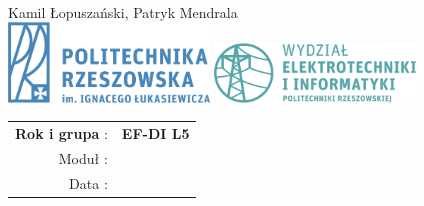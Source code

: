 \begin{titlepage}
	\begin{center}
		\vspace*{7cm}
		{\Huge \nazwacwiczenia}\\
		\vspace*{1cm}
		{\Large Kamil \L opusza\'{n}ski, Patryk Mendrala} \\
		\vspace*{1cm}
		\vfill
		\includegraphics[scale=0.1, width=0.4\textwidth]{logo/logo_prz} \hspace*{2pt} \includegraphics[scale=0.1, width=0.4\textwidth]{logo/logo_weii}
		\vspace*{0.4cm}
		\vfill
		\begin{tabular}{r<{:}l}
			\textbf{Rok i grupa} & \textbf{EF-DI L5} \\
			Moduł & \modul \\
			Data & \datacwiczenia
		\end{tabular}
	\end{center}
	
\end{titlepage}
